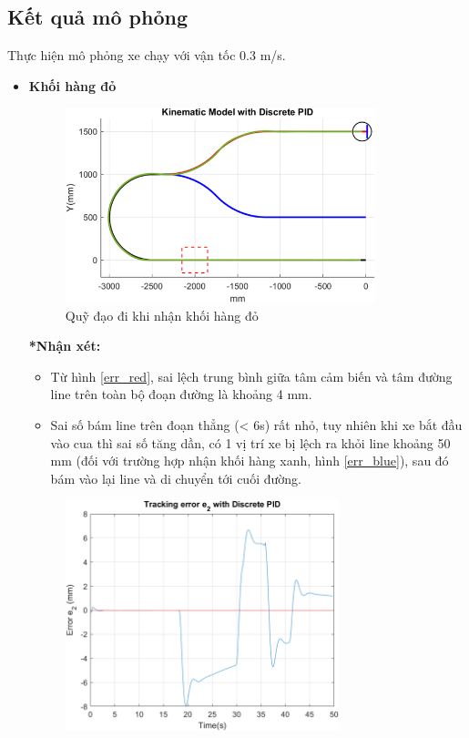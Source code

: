           \subsection{Kết quả mô phỏng}
          Thực hiện mô phỏng xe chạy với vận tốc 0.3 m/s.
          \begin{itemize}
               \item \textbf{Khối hàng đỏ}
                    \begin{figure}[H]
                         \centering
                         \includegraphics[width=0.85\textwidth]{pictures/chapter8/trajec_red.png}
                         \caption{Quỹ đạo đi khi nhận khối hàng đỏ}
                         \label{tra_red}
                    \end{figure}
               \textbf{*Nhận xét:}
               \begin{itemize}
                    \item Từ hình \ref{err_red}, sai lệch trung bình giữa tâm cảm biến và tâm đường line trên toàn bộ đoạn đường là khoảng 4 mm.
                    \item Sai số bám line trên đoạn thẳng (< 6s) rất nhỏ, tuy nhiên khi xe bắt đầu vào cua thì sai số tăng dần, có 1 vị trí xe bị lệch ra khỏi line khoảng 50 mm (đối với trường hợp nhận khối hàng xanh, hình \ref{err_blue}), sau đó bám vào lại line và di chuyển tới cuối đường. 
               \end{itemize}
                    \begin{figure}[H]
                         \centering
                         \includegraphics[width=0.75\textwidth]{pictures/chapter8/err_red.png}

\end{figure}
\end{itemize}
